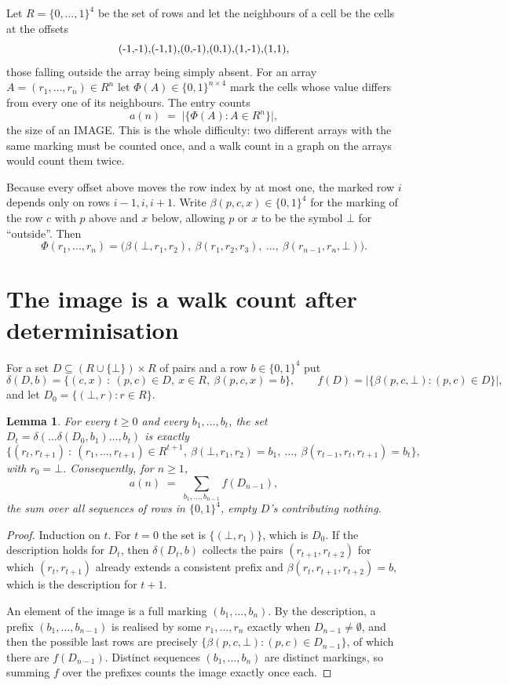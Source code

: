 \documentclass[11pt,a4paper]{article}
\theoremstyle{plain}
\newtheorem{lemma}[theorem]{Lemma}
\theoremstyle{definition}
\begin{document}
Let $R=\{0,\dots,1\}^{4}$ be the set of rows and let the neighbours of a cell be the
cells at the offsets
\[
$(-1,-1)$, $(-1,1)$, $(0,-1)$, $(0,1)$, $(1,-1)$, $(1,1)$,
\]
those falling outside the array being simply absent. For an array
$A=(r_1,\dots,r_n)\in R^n$ let $\Phi(A)\in\{0,1\}^{n\times4}$ mark the cells whose value
differs from every one of its neighbours. The entry counts
\[
a(n)\;=\;\bigl|\{\Phi(A):A\in R^n\}\bigr| ,
\]
the size of an IMAGE. This is the whole difficulty: two different arrays with the same marking
must be counted once, and a walk count in a graph on the arrays would count them twice.

Because every offset above moves the row index by at most one, the marked row $i$ depends only
on rows $i-1,i,i+1$. Write $\beta(p,c,x)\in\{0,1\}^{4}$ for the marking of the row $c$
with $p$ above and $x$ below, allowing $p$ or $x$ to be the symbol $\bot$ for ``outside''.
Then
\[
\Phi(r_1,\dots,r_n)=\bigl(\beta(\bot,r_1,r_2),\ \beta(r_1,r_2,r_3),\ \dots,\
\beta(r_{n-1},r_n,\bot)\bigr).
\]

\section{The image is a walk count after determinisation}

For a set $D\subseteq(R\cup\{\bot\})\times R$ of pairs and a row $b\in\{0,1\}^{4}$ put
\[
\delta(D,b)=\{(c,x)\ :\ (p,c)\in D,\ x\in R,\ \beta(p,c,x)=b\},\qquad
f(D)=\bigl|\{\beta(p,c,\bot):(p,c)\in D\}\bigr| ,
\]
and let $D_0=\{(\bot,r):r\in R\}$.

\begin{lemma}\label{lem:det}
For every $t\ge0$ and every $b_1,\dots,b_t$, the set
$D_t=\delta(\dots\delta(D_0,b_1)\dots,b_t)$ is exactly
\[
\{(r_t,r_{t+1})\ :\ (r_1,\dots,r_{t+1})\in R^{t+1},\ \beta(\bot,r_1,r_2)=b_1,\ \dots,\
\beta(r_{t-1},r_t,r_{t+1})=b_t\} ,
\]
with $r_0=\bot$. Consequently, for $n\ge1$,
\[
a(n)\;=\;\sum_{b_1,\dots,b_{n-1}}f(D_{n-1}),
\]
the sum over all sequences of rows in $\{0,1\}^{4}$, empty $D$'s contributing nothing.
\end{lemma}

\begin{proof}
Induction on $t$. For $t=0$ the set is $\{(\bot,r_1)\}$, which is $D_0$. If the description
holds for $D_t$, then $\delta(D_t,b)$ collects the pairs $(r_{t+1},r_{t+2})$ for which
$(r_t,r_{t+1})$ already extends a consistent prefix and
$\beta(r_t,r_{t+1},r_{t+2})=b$, which is the description for $t+1$.

An element of the image is a full marking $(b_1,\dots,b_n)$. By the description, a prefix
$(b_1,\dots,b_{n-1})$ is realised by some $r_1,\dots,r_n$ exactly when $D_{n-1}\neq
\emptyset$, and then the possible last rows are precisely
$\{\beta(p,c,\bot):(p,c)\in D_{n-1}\}$, of which there are $f(D_{n-1})$. Distinct
sequences $(b_1,\dots,b_n)$ are distinct markings, so summing $f$ over the prefixes counts the
image exactly once each.
\end{proof}
\end{document}
